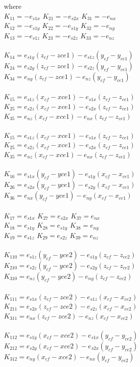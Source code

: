 where \\
$K_{11} = -e_{s1x}$    $K_{21} = -e_{s2x}$    $K_{31} = -e_{nx}$ \\
$K_{12} = -e_{s1y}$    $K_{22} = -e_{s1y}$    $K_{32} = -e_{ny}$ \\
$K_{13} = -e_{s1z}$    $K_{23} = -e_{s2z}$    $K_{33} = -e_{nz}$ \\
\\
$K_{14} = e_{s1y}(z_{cf}-z{ce1})-e_{s1z}(y_{cf}-y_{ce1})$\\
$K_{24} = e_{s2y}(z_{cf}-z{ce1})-e_{s2z}(y_{cf}-y_{ce1})$\\
$K_{34} = e_{ny}(z_{cf}-z{ce1})-e_{nz}(y_{cf}-y_{ce1})$\\
\\
$K_{15} = e_{s1z}(x_{cf}-x{ce1})-e_{s1x}(z_{cf}-z_{ce1})$\\
$K_{25} = e_{s2z}(x_{cf}-x{ce1})-e_{s2x}(z_{cf}-z_{ce1})$\\
$K_{35} = e_{nz}(x_{cf}-x{ce1})-e_{nx}(z_{cf}-z_{ce1})$\\
\\
$K_{15} = e_{s1z}(x_{cf}-x{ce1})-e_{s1x}(z_{cf}-z_{ce1})$\\
$K_{25} = e_{s2z}(x_{cf}-x{ce1})-e_{s2x}(z_{cf}-z_{ce1})$\\
$K_{35} = e_{nz}(x_{cf}-x{ce1})-e_{nx}(z_{cf}-z_{ce1})$\\
\\
$K_{16} = e_{s1x}(y_{cf}-y{ce1})-e_{s1y}(x_{cf}-x_{ce1})$\\
$K_{26} = e_{s2x}(y_{cf}-y{ce1})-e_{s2y}(x_{cf}-x_{ce1})$\\
$K_{36} = e_{nx}(y_{cf}-y{ce1})-e_{ny}(x_{cf}-x_{ce1})$\\
\\
$K_{17} = e_{s1x}$    $K_{27} = e_{s2x}$    $K_{37} = e_{nx}$ \\
$K_{18} = e_{s1y}$    $K_{28} = e_{s1y}$    $K_{38} = e_{ny}$ \\
$K_{19} = e_{s1z}$    $K_{29} = e_{s2z}$    $K_{39} = e_{nz}$ \\
\\
$K_{110} = e_{s1z}(y_{cf}-y{ce2})-e_{s1y}(z_{cf}-z_{ce2})$\\
$K_{210} = e_{s2z}(y_{cf}-y{ce2})-e_{s2y}(z_{cf}-z_{ce2})$\\
$K_{310} = e_{nz}(y_{cf}-y{ce2})-e_{ny}(z_{cf}-z_{ce2})$\\
\\
$K_{111} = e_{s1x}(z_{cf}-z{ce2})-e_{s1z}(x_{cf}-x_{ce2})$\\
$K_{211} = e_{s2x}(z_{cf}-z{ce2})-e_{s2z}(x_{cf}-x_{ce2})$\\
$K_{311} = e_{nx}(z_{cf}-z{ce2})-e_{nz}(x_{cf}-x_{ce2})$\\
\\
$K_{112} = e_{s1y}(x_{cf}-x{ce2})-e_{s1x}(y_{cf}-y_{ce2})$\\
$K_{212} = e_{s2y}(x_{cf}-x{ce2})-e_{s2x}(y_{cf}-y_{ce2})$\\
$K_{312} = e_{ny}(x_{cf}-x{ce2})-e_{nx}(y_{cf}-y_{ce2})$\\

